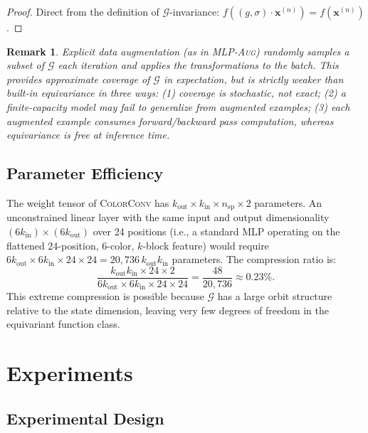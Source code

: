 \documentclass[11pt]{article}
\newtheorem{remark}[theorem]{Remark}
\newcommand{\bx}{\mathbf{x}}
\begin{document}
\begin{proof}
Direct from the definition of $\mathcal{G}$-invariance:
$f((g,\sigma)\cdot\bx^{(n)}) = f(\bx^{(n)})$.
\end{proof}

\begin{remark}
Explicit data augmentation (as in \textsc{MLP-Aug}) randomly samples a
subset of $\mathcal{G}$ each iteration and applies the transformations
to the batch.
This provides approximate coverage of $\mathcal{G}$ in expectation,
but is strictly weaker than built-in equivariance in three ways:
(1) coverage is stochastic, not exact;
(2) a finite-capacity model may fail to generalize from augmented examples;
(3) each augmented example consumes forward/backward pass computation,
whereas equivariance is free at inference time.
\end{remark}

\subsection{Parameter Efficiency}

The weight tensor of \textsc{ColorConv} has
$k_{\mathrm{out}} \times k_{\mathrm{in}} \times n_{\mathrm{sp}} \times 2$
parameters.
An unconstrained linear layer with the same input and output dimensionality
$(6k_{\mathrm{in}}) \times (6k_{\mathrm{out}})$ over 24 positions (i.e., a
standard MLP operating on the flattened 24-position, 6-color, $k$-block
feature) would require
$6k_{\mathrm{out}} \times 6k_{\mathrm{in}} \times 24 \times 24 = 20{,}736\,k_{\mathrm{out}} k_{\mathrm{in}}$
parameters.
The compression ratio is:
\begin{equation}
  \frac{k_{\mathrm{out}} k_{\mathrm{in}} \times 24 \times 2}
       {6k_{\mathrm{out}} \times 6k_{\mathrm{in}} \times 24 \times 24}
  = \frac{48}{20{,}736}
  \approx 0.23\%.
\end{equation}
This extreme compression is possible because $\mathcal{G}$ has a large orbit
structure relative to the state dimension, leaving very few degrees of freedom
in the equivariant function class.

\section{Experiments}
\label{sec:experiments}

\subsection{Experimental Design}
\end{document}
